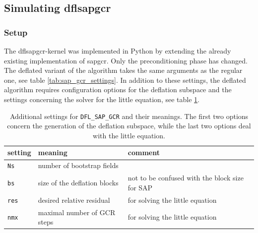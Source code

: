 \documentclass{article}
\theoremstyle{plain} %
\theoremstyle{convention} %
\theoremstyle{remark} %
\def\code#1{\texttt{#1}}
\numberwithin{equation}{section}
\begin{document}
\subsection{Simulating \acrshort*{dflsapgcr}}

\label{sec:dfl_sap_gcr_results}

\subsubsection{Setup}

The \acrshort{dflsapgcr}-kernel was implemented in Python by extending the already existing implementation of \acrshort{sapgcr}. Only the preconditioning phase has changed. The deflated variant of the algorithm takes the same arguments as the regular one, see table \ref{tab:sap_gcr_settings}. In addition to these settings, the deflated algorithm requires configuration options for the deflation subspace and the settings concerning the solver for the little equation, see table \ref{tab:dfl_sap_gcr_settings}.

\begin{table}[H]
\centering
    \begin{tabular}{ |p{1.5cm}|p{6cm}|p{4.5cm}|  }
        \hline
        setting & meaning & comment \\
        \hline\hline
        \code{Ns}  & number of bootstrap fields & \\
        \hline
        \code{bs}  & size of the deflation blocks & not to be confused with the block size for SAP \\
        \hline
        \code{res}  & desired relative residual & for solving the little equation \\
        \hline
        \code{nmx}  & maximal number of GCR steps & for solving the little equation \\
        \hline
    \end{tabular}
    \caption{Additional settings for \code{DFL\_SAP\_GCR} and their meanings. The first two options concern the generation of the deflation subspace, while the last two options deal with the little equation.}
    \label{tab:dfl_sap_gcr_settings}
\end{table}
\end{document}
